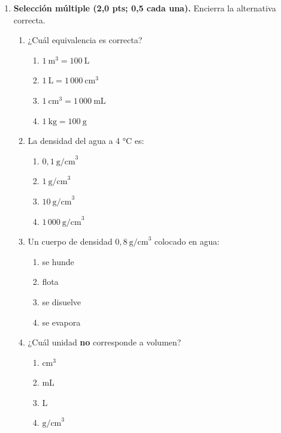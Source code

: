 \documentclass[12pt, letterpaper]{article}
\begin{document}
\begin{enumerate}[leftmargin=*, label=\textbf{\arabic*.}, itemsep=0.5em]

  \item \textbf{Selección múltiple (2,0 pts; 0,5 cada una).} Encierra la alternativa correcta.
        \begin{enumerate}[label=\alph*), leftmargin=1.8em, itemsep=0.25em]
          \item ¿Cuál equivalencia es correcta?
                \begin{enumerate}[label=\Alph*), leftmargin=1.6em, itemsep=0pt, topsep=2pt]
                  \item $1\ \text{m}^3=100\ \text{L}$
                  \item $1\ \text{L}=1\,000\ \text{cm}^3$
                  \item $1\ \text{cm}^3=1\,000\ \text{mL}$
                  \item $1\ \text{kg}=100\ \text{g}$
                \end{enumerate}
          \item La densidad del agua a 4 °C es:
                \begin{enumerate}[label=\Alph*), leftmargin=1.6em, itemsep=0pt, topsep=2pt]
                  \item $0{,}1\ \text{g/cm}^3$
                  \item $1\ \text{g/cm}^3$
                  \item $10\ \text{g/cm}^3$
                  \item $1\,000\ \text{g/cm}^3$
                \end{enumerate}
          \item Un cuerpo de densidad $0{,}8\ \text{g/cm}^3$ colocado en agua:
                \begin{enumerate}[label=\Alph*), leftmargin=1.6em, itemsep=0pt, topsep=2pt]
                  \item se hunde
                  \item flota
                  \item se disuelve
                  \item se evapora
                \end{enumerate}
          \item ¿Cuál unidad \textbf{no} corresponde a volumen?
                \begin{enumerate}[label=\Alph*), leftmargin=1.6em, itemsep=0pt, topsep=2pt]
                  \item $\text{cm}^3$
                  \item mL
                  \item L
                  \item $\text{g/cm}^3$
                \end{enumerate}
        \end{enumerate}


\end{enumerate}
\end{document}
